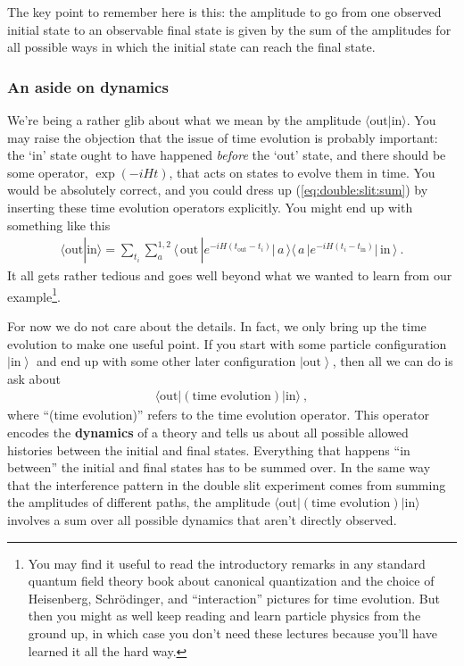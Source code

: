 \documentclass[12pt]{article}
\numberwithin{equation}{section}    %
\theoremstyle{definition}
\begin{document}
The key point to remember here is this: the amplitude to go from one observed initial state to an observable final state is given by the sum of the amplitudes for all possible ways in which the initial state can reach the final state. 


\subsubsection{An aside on dynamics}


We're being a rather glib about what we mean by the amplitude $\langle \text{out} | \text{in}\rangle$. You may raise the objection that the issue of time evolution is probably important: the `in' state ought to have happened \emph{before} the `out' state, and there should be some operator, $\exp(-iHt)$, that acts on states to evolve them in time. You would be absolutely correct, and you could dress up (\ref{eq:double:slit:sum}) by inserting these time evolution operators explicitly. You might end up with something like this
\begin{align}
	\langle \text{out} | \text{in}\rangle
	 = 
	\sum_{t_i}
	\sum_{a}^{1,2}
	\langle \,\text{out}\, | e^{-iH(t_\text{out}-t_i)} | \, a \,\rangle
		\langle \, a\,  |  e^{-iH(t_i-t_\text{in})} |  \,\text{in} \,\rangle \ .
\end{align}
It all gets rather tedious and goes well beyond what we wanted to learn from our example\footnote{You may find it useful to read the introductory remarks in any standard quantum field theory book about canonical quantization and the choice of Heisenberg, Schr\"odinger, and ``interaction'' pictures for time evolution. But then you might as well keep reading and learn particle physics from the ground up, in which case you don't need these lectures because you'll have learned it all the hard way.}.

For now we do not care about the details. In fact, we only bring up the time evolution to make one useful point.  If you start with some particle configuration $\left|\text{in}\right\rangle$ and end up with some other later configuration $\left|\text{out}\right\rangle$, then all we can do is ask about
\begin{align}
	\langle \text{out} | (\text{time evolution}) | \text{in}\rangle \ ,
\end{align}
where ``(time evolution)'' refers to the time evolution operator. This operator encodes the \textbf{dynamics} of a theory and tells us about all possible allowed histories between the initial and final states. Everything that happens ``in between'' the initial and final states has to be summed over. In the same way that the interference pattern in the double slit experiment comes from summing the amplitudes of different paths, the amplitude $\langle \text{out} | (\text{time evolution}) | \text{in}\rangle $ involves a sum over all possible dynamics that aren't directly observed. 
\end{document}
